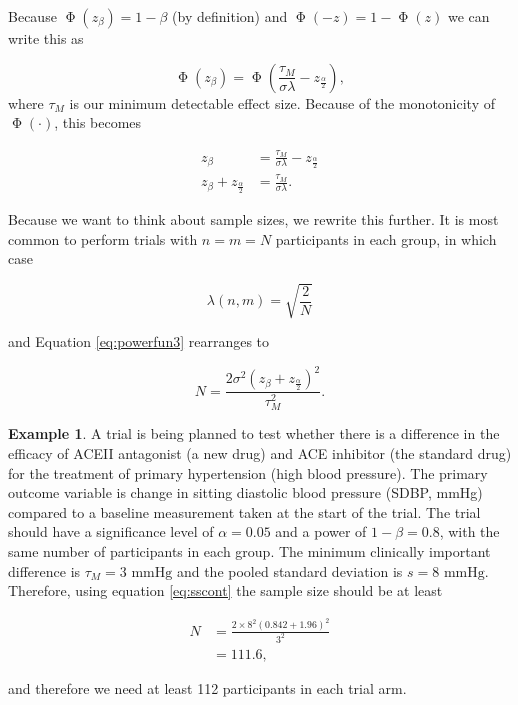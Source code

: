 \documentclass[
  openany]{book}
\theoremstyle{definition}
\theoremstyle{definition}
\newtheorem{example}{Example}[chapter]
\theoremstyle{definition}
\theoremstyle{definition}
\theoremstyle{remark}
\begin{document}
Because \(\operatorname{\Phi}\left(z_\beta\right) = 1 - \beta\) (by definition) and \(\operatorname{\Phi}\left(-z\right) = 1 - \operatorname{\Phi}\left(z\right)\) we can write this as

\[ \operatorname{\Phi}\left(z_\beta\right) = \operatorname{\Phi}\left(\frac{\tau_M}{\sigma\lambda} - z_{\frac{\alpha}{2}}\right), \]
where \(\tau_M\) is our minimum detectable effect size. Because of the monotonicity of \(\operatorname{\Phi}\left(\cdot\right)\), this becomes

\begin{equation}
\begin{aligned}
  z_\beta & = \frac{\tau_M}{\sigma\lambda} - z_{\frac{\alpha}{2}} \\
  z_\beta + z_{\frac{\alpha}{2}} & = \frac{\tau_M}{\sigma\lambda}.
\end{aligned}
\label{eq:powerfun3}
\end{equation}

Because we want to think about sample sizes, we rewrite this further. It is most common to perform trials with \(n=m=N\) participants in each group, in which case

\[ \lambda\left(n,m\right) = \sqrt{\frac{2}{N}}\]

and Equation \eqref{eq:powerfun3} rearranges to

\begin{equation}
    N = \frac{2\sigma^2\left(z_\beta + z_{\frac{\alpha}{2}}\right)^2}{\tau_M^2}.
    \label{eq:sscont}
\end{equation}

\begin{example}
\citep[from][]{zhong2009calculate}
A trial is being planned to test whether there is a difference in the efficacy of ACEII antagonist (a new drug) and ACE inhibitor (the standard drug) for the treatment of primary hypertension (high blood pressure). The primary outcome variable is change in sitting diastolic blood pressure (SDBP, mmHg) compared to a baseline measurement taken at the start of the trial. The trial should have a significance level of \(\alpha=0.05\) and a power of \(1-\beta = 0.8\), with the same number of participants in each group. The minimum clinically important difference is \(\tau_M = 3 \text{ mmHg}\) and the pooled standard deviation is \(s = 8 \text{ mmHg}\). Therefore, using equation \eqref{eq:sscont} the sample size should be at least

\begin{align*}
      N & = \frac{2\times{8}^2\left(0.842 + 1.96\right)^2}{3^2}\\
      & = 111.6,
\end{align*}

and therefore we need at least 112 participants in each trial arm.
\end{example}
\end{document}
